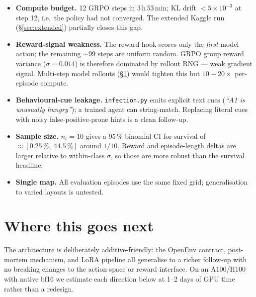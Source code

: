 \documentclass[11pt,a4paper]{article}
\begin{document}
\begin{itemize}[leftmargin=*]
  \item \textbf{Compute budget.} 12 GRPO steps in 3\,h\,53\,min;
        KL drift $<5\!\times\!10^{-3}$ at step 12, i.e.\ the policy had
        not converged. The extended Kaggle run (§\ref{sec:extended})
        partially closes this gap.
  \item \textbf{Reward-signal weakness.} The reward hook scores only the
        \emph{first} model action; the remaining $\sim$99 steps are
        uniform random. GRPO group reward variance ($\sigma{=}0.014$) is
        therefore dominated by rollout RNG --- weak gradient signal.
        Multi-step model rollouts (§\ref{sec:future}) would tighten this
        but $10{-}20\!\times$ per-episode compute.
  \item \textbf{Behavioural-cue leakage.} \texttt{infection.py} emits
        explicit text cues (\textit{``A1 is unusually hungry''}); a
        trained agent can string-match. Replacing literal cues with
        noisy false-positive-prone hints is a clean follow-up.
  \item \textbf{Sample size.} $n_t{=}10$ gives a 95\,\% binomial CI for
        survival of $\approx[0.25\,\%,\ 44.5\,\%]$ around $1/10$. Reward
        and episode-length deltas are larger relative to within-class
        $\sigma$, so those are more robust than the survival headline.
  \item \textbf{Single map.} All evaluation episodes use the same fixed
        grid; generalisation to varied layouts is untested.
\end{itemize}

\section{Where this goes next}
\label{sec:future}

The architecture is deliberately additive-friendly: the OpenEnv contract,
post-mortem mechanism, and LoRA pipeline all generalise to a richer
follow-up with no breaking changes to the action space or reward interface.
On an A100/H100 with native bf16 we estimate each direction below at
1--2 days of GPU time rather than a redesign.
\end{document}
